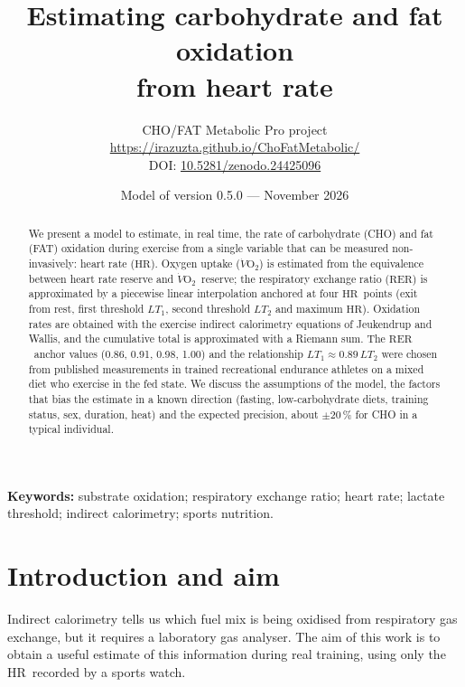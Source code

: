 \documentclass[10pt,a4paper]{article}
\title{\textbf{Estimating carbohydrate and fat oxidation\\
from heart rate}}
\author{CHO/FAT Metabolic Pro project\\
\small\url{https://irazuzta.github.io/ChoFatMetabolic/}\\[2pt]
\small DOI: \href{https://doi.org/10.5281/zenodo.24425096}{10.5281/zenodo.24425096}}
\date{Model of version 0.5.0 --- November 2026}
\newcommand{\VO}{\ensuremath{\dot V\mathrm{O_2}}}
\newcommand{\RER}{\ensuremath{\mathrm{RER}}}
\newcommand{\FC}{\ensuremath{\mathrm{HR}}}
\begin{document}
\maketitle
{\let\thefootnote\relax{}}

\begin{abstract}
\noindent
We present a model to estimate, in real time, the rate of carbohydrate (CHO) and fat (FAT)
oxidation during exercise from a single variable that can be measured non-invasively: heart
rate (\FC). Oxygen uptake (\VO) is estimated from the equivalence between heart rate reserve
and \VO\ reserve; the respiratory exchange ratio (\RER) is approximated by a piecewise
linear interpolation anchored at four \FC\ points (exit from rest, first threshold $LT_1$,
second threshold $LT_2$ and maximum \FC). Oxidation rates are obtained with the exercise
indirect calorimetry equations of Jeukendrup and Wallis, and the cumulative total is
approximated with a Riemann sum. The \RER\ anchor values (0.86, 0.91, 0.98, 1.00) and the
relationship $LT_1\approx0.89\,LT_2$ were chosen from published measurements in trained
recreational endurance athletes on a mixed diet who exercise in the fed state. We discuss
the assumptions of the model, the factors that bias the estimate in a known direction
(fasting, low-carbohydrate diets, training status, sex, duration, heat) and the expected
precision, about $\pm20\,\%$ for CHO in a typical individual.
\end{abstract}

\noindent\textbf{Keywords:} substrate oxidation; respiratory exchange ratio; heart rate;
lactate threshold; indirect calorimetry; sports nutrition.

\section{Introduction and aim}

Indirect calorimetry tells us which fuel mix is being oxidised from respiratory gas
exchange, but it requires a laboratory gas analyser. The aim of this work is to obtain a
useful estimate of this information during real training, using only the \FC\ recorded by
a sports watch.
\end{document}

